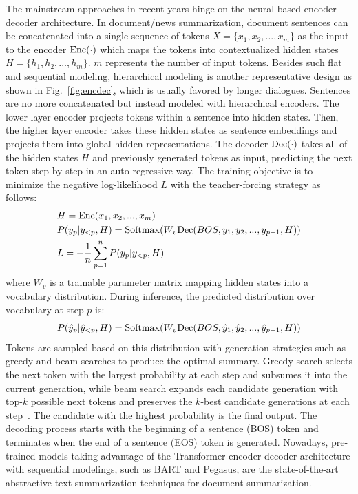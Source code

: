 The mainstream approaches in recent years hinge on the neural-based encoder-decoder architecture.  
In document/news summarization, 
document sentences can be concatenated into a single sequence of tokens $X=\{x_1, x_2, ..., x_m\}$ as the input to the encoder ${\rm Enc}(\cdot)$ which maps the tokens into 
contextualized hidden states $H = \{h_1, h_2, ..., h_m\}$. $m$ represents the number of input tokens. 
Besides such flat and sequential modeling, hierarchical modeling is another representative design as shown in Fig.~\ref{fig:encdec}, which is usually favored by longer dialogues. Sentences are no more concatenated but instead modeled with hierarchical encoders. The lower layer encoder projects tokens within a sentence into hidden states. Then, the higher layer encoder takes these hidden states as sentence embeddings and projects them into global hidden representations.
The decoder ${\rm Dec}(\cdot)$ takes all of the hidden states $H$ and previously generated tokens 
as input, predicting the next token step by step in an auto-regressive way. The training objective is to minimize the negative log-likelihood $L$ with the teacher-forcing strategy as follows:
\begin{equation}
	\begin{aligned}
		&H= {\rm Enc}(x_1, x_2, ..., x_m) \\
		&P(y_p|y_{<p},H) = {\rm Softmax}(W_v{\rm Dec}(BOS, y_1, y_2, ..., y_{p-1}, H))\\
		&L = -\frac{1}{n}\sum_{p=1}^n P(y_p|y_{<p}, H) 
	\end{aligned}
\end{equation}
where $W_v$ is a trainable parameter matrix mapping hidden states into a vocabulary distribution. During inference, the predicted distribution over vocabulary at step $p$ is:
\begin{equation}
		P(\hat{y}_p|\hat{y}_{<p},H) = {\rm Softmax}(W_v{\rm Dec}(BOS, \hat{y}_1, \hat{y}_2, ..., \hat{y}_{p-1}, H))
\end{equation}
Tokens are sampled based on this distribution with generation strategies such as greedy and beam searches to produce the optimal summary. 
Greedy search selects the next token with the largest probability at each step and subsumes it into the current generation, while beam search expands each candidate generation with top-$k$ possible next tokens and preserves the $k$-best candidate generations at each step~\cite{rush2015neural}. The candidate with the highest probability is the final output.
The decoding process starts with the beginning of a sentence (BOS) token and terminates when the end of a sentence (EOS) token is generated. 
Nowadays, pre-trained models taking advantage of the Transformer encoder-decoder architecture with sequential modelings, such as BART and Pegasus, are the state-of-the-art abstractive text summarization techniques for document summarization.


